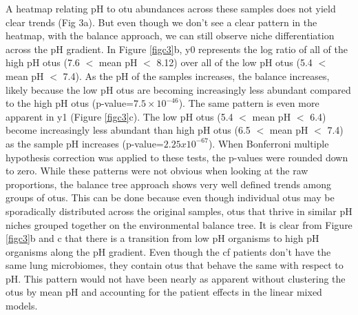  A heatmap relating pH to \gls{otu} abundances across these samples does not yield clear trends (Fig 3a).  But even though we don't see a clear pattern in the heatmap, with the balance approach, we can still observe niche differentiation across the pH gradient.  In Figure \ref{figc3}b, y0 represents the log ratio of all of the high pH \gls{otu}s (7.6 $<$ mean pH $<$ 8.12) over all of the low pH \gls{otu}s (5.4 $<$ mean pH $<$ 7.4).  As the pH of the samples increases, the balance increases, likely because the low pH \gls{otu}s are becoming increasingly less abundant compared to the high pH \gls{otu}s (p-value=$7.5 \times 10^{-46}$).  The same pattern is even more apparent in y1 (Figure \ref{figc3}c). The low pH \gls{otu}s (5.4 $<$ mean pH $<$ 6.4) become increasingly less abundant than high pH \gls{otu}s (6.5 $<$ mean pH $<$ 7.4) as the sample pH increases (p-value=$2.25 x 10^{-67}$).  When Bonferroni multiple hypothesis correction was applied to these tests, the p-values were rounded down to zero.  While these patterns were not obvious when looking at the raw proportions, the balance tree approach shows very well defined trends among groups of \gls{otu}s. This can be done because even though individual \gls{otu}s may be sporadically distributed across the original samples, \gls{otu}s that thrive in similar pH niches grouped together on the environmental balance tree.  It is clear from Figure \ref{figc3}b and c that there is a transition from low pH organisms to high pH organisms along the pH gradient.  Even though the \gls{cf} patients don't have the same lung microbiomes, they contain \gls{otu}s that behave the same with respect to pH.  This pattern would not have been nearly as apparent without clustering the \gls{otu}s by mean pH and accounting for the patient effects in the linear mixed models.
